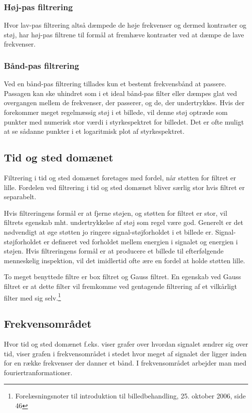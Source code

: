 \subsubsection{Høj-pas filtrering}
Hvor lav-pas filtrering altså dæmpede de høje frekvenser og dermed kontraster og støj, har høj-pas filtrene til formål at fremhæve kontraster ved at dæmpe de lave frekvenser. 

\subsubsection{Bånd-pas filtrering}
Ved en bånd-pas filtrering tillades kun et bestemt frekvensbånd at passere. Passagen kan ske uhindret som i et ideal bånd-pas filter eller dæmpes glat ved overgangen mellem de frekvenser, der passerer, og de, der undertrykkes. Hvis der forekommer meget regelmæssig støj i et billede, vil denne støj optræde som punkter med numerisk stor værdi i styrkespektret for billedet. Det er ofte muligt at se sådanne punkter i et logaritmisk plot af styrkespektret.

\subsection{Tid og sted domænet}
Filtrering i tid og sted domænet foretages med fordel, når støtten for filtret er lille. Fordelen ved filtrering i tid og sted domænet bliver særlig stor hvis filtret er separabelt. 

Hvis filtreringens formål er at fjerne støjen, og støtten for filtret er stor, vil filtrets egenskab mht. undertrykkelse af støj som regel være god. Generelt er det nødvendigt at øge støtten jo ringere signal-støjforholdet i et billede er. Signal-støjforholdet er defineret ved forholdet mellem energien i signalet og energien i støjen. Hvis filtreringens formål er at producere et billede til efterfølgende menneskelig inspektion, vil det imidlertid ofte ære en fordel at holde støtten lille.

To meget benyttede filtre er box filtret og Gauss filtret. En egenskab ved Gauss filtret er at dette filter vil fremkomme ved gentagende filtrering af et vilkårligt filter med sig selv.\footnote{Forelæsningsnoter til introduktion til billedbehandling, 25. oktober 2006, side 46}

\subsection{Frekvensområdet}
Hvor tid og sted domænet f.eks. viser grafer over hvordan signalet ændrer sig over tid, viser grafen i frekvensområdet i stedet hvor meget af signalet der ligger inden for en række frekvenser der danner et bånd. I frekvensområdet arbejder man med fouriertranformationer.

